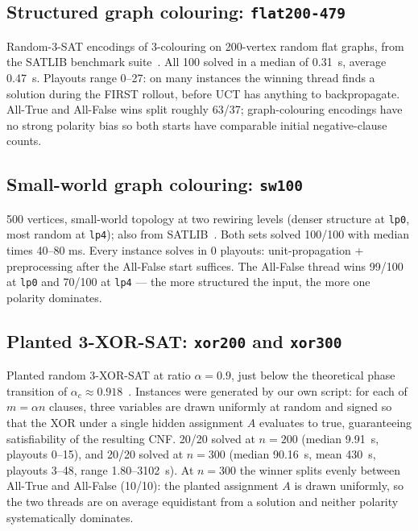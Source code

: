 \documentclass[11pt]{article}
\begin{document}
\subsection{Structured graph colouring: \texttt{flat200-479}}

Random-3-SAT encodings of 3-colouring on 200-vertex random flat
graphs, from the SATLIB benchmark suite~\cite{hoos:satlib}. All 100
solved in a median of 0.31~s, average 0.47~s.
Playouts range 0--27: on many instances the winning thread finds a
solution during the FIRST rollout, before UCT has anything to
backpropagate. All-True and All-False wins split roughly 63/37;
graph-colouring encodings have no strong polarity bias so both
starts have comparable initial negative-clause counts.

\subsection{Small-world graph colouring: \texttt{sw100}}

500 vertices, small-world topology at two rewiring levels (denser
structure at \texttt{lp0}, most random at \texttt{lp4}); also from
SATLIB~\cite{hoos:satlib}. Both sets solved 100/100 with median times
40--80 ms. Every instance solves in
0 playouts: unit-propagation + preprocessing after the All-False
start suffices. The All-False thread wins 99/100 at \texttt{lp0} and
70/100 at \texttt{lp4} — the more structured the input, the more
one polarity dominates.

\subsection{Planted 3-XOR-SAT: \texttt{xor200} and \texttt{xor300}}

Planted random 3-XOR-SAT at ratio $\alpha = 0.9$, just below the
theoretical phase transition of $\alpha_c \approx
0.918$~\cite{ricci:xorsat}. Instances were generated by our own
script: for each of $m = \alpha n$ clauses, three variables are drawn
uniformly at random and signed so that the XOR under a single hidden
assignment $A$ evaluates to true, guaranteeing satisfiability of the
resulting CNF. 20/20 solved at $n=200$ (median 9.91~s, playouts
0--15), and 20/20 solved at $n=300$ (median 90.16~s, mean 430~s,
playouts 3--48, range 1.80--3102~s). At $n=300$ the winner splits
evenly between All-True and All-False (10/10): the planted assignment
$A$ is drawn uniformly, so the two threads are on average equidistant
from a solution and neither polarity systematically dominates.
\end{document}
